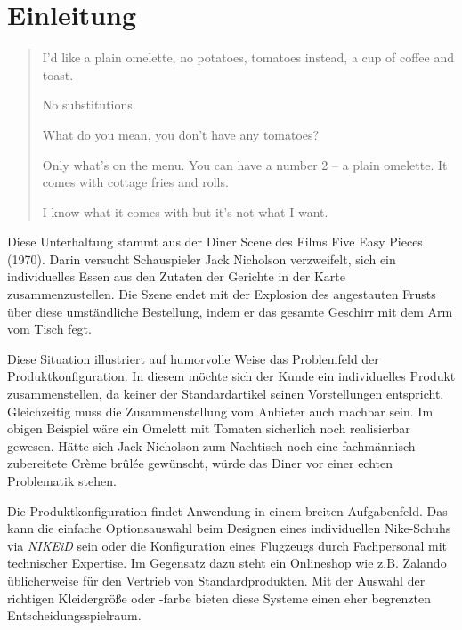 \documentclass[11pt, a4paper, titlepage, listof=totoc, bibliography=totoc, index=totoc, twoside, openright, headings=normal]{scrreprt}
\begin{document}






%






\chapter{Einleitung}
\begin{quote}
\glqq I'd like a plain omelette, no potatoes, tomatoes instead, a cup of coffee and toast.\grqq{}
\begin{addmargin}[25pt]{0pt} 
\glqq No substitutions.\grqq{}
\end{addmargin}
\glqq What do you mean, you don't have any tomatoes?\grqq{}
\begin{addmargin}[25pt]{0pt} 
\glqq Only what's on the menu. You can have a number 2 -- a plain omelette. It comes with cottage fries and rolls.\grqq{}
\end{addmargin}
\glqq I know what it comes with but it's not what I want.\grqq{}
\end{quote}
Diese Unterhaltung stammt aus der \glqq Diner Scene\grqq{} des Films \glqq Five Easy Pieces\grqq{} (1970). Darin versucht Schauspieler Jack Nicholson verzweifelt, sich ein individuelles Essen aus den Zutaten der Gerichte in der Karte zusammenzustellen. Die Szene endet mit der Explosion des angestauten Frusts über diese umständliche Bestellung, indem er das gesamte Geschirr mit dem Arm vom Tisch fegt.

Diese Situation illustriert auf humorvolle Weise das Problemfeld der Produktkonfiguration. In diesem möchte sich der Kunde ein individuelles Produkt zusammenstellen, da keiner der Standardartikel seinen Vorstellungen entspricht. Gleichzeitig muss die Zusammenstellung vom Anbieter auch machbar sein. Im obigen Beispiel wäre ein Omelett mit Tomaten sicherlich noch realisierbar gewesen. Hätte sich Jack Nicholson zum Nachtisch noch eine fachmännisch zubereitete Crème brûlée gewünscht, würde das Diner vor einer echten Problematik stehen.

Die Produktkonfiguration findet Anwendung in einem breiten Aufgabenfeld. Das kann die einfache Optionsauswahl beim Designen eines individuellen Nike-Schuhs via \emph{NIKEiD} sein oder die Konfiguration eines Flugzeugs durch Fachpersonal mit technischer Expertise. Im Gegensatz dazu steht ein Onlineshop wie z.B. Zalando üblicherweise für den Vertrieb von Standardprodukten. Mit der Auswahl der richtigen Kleidergröße oder -farbe bieten diese Systeme einen eher begrenzten Entscheidungsspielraum.
\end{document}
